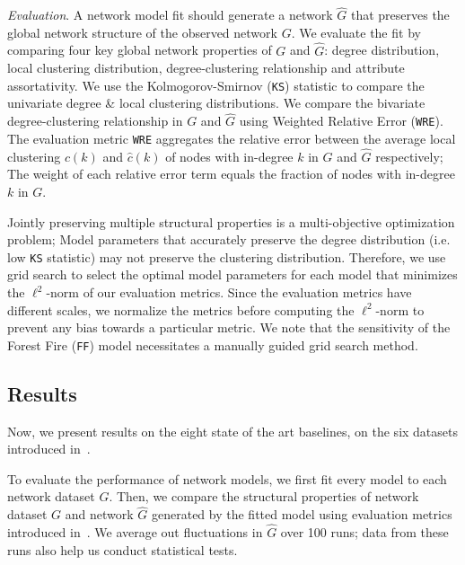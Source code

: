 \textit{Evaluation}. A network model fit should generate a network $\hat{G}$ that
preserves the global network structure of the observed network $G$. We evaluate
the fit by comparing four key global network properties of ${G}$ and $\hat{G}$:
degree distribution, local clustering distribution, degree-clustering relationship
and attribute assortativity.
We use the Kolmogorov-Smirnov (\texttt{KS}) statistic to compare the univariate degree
\& local clustering distributions.
We compare the bivariate degree-clustering relationship in $G$ and $\hat{G}$ using
Weighted Relative Error (\texttt{WRE}). The evaluation metric \texttt{WRE} aggregates the relative error
between the average local clustering $c(k)$ and $\hat{c}(k)$ of nodes  with in-degree $k$
in $G$ and $\hat{G}$ respectively; The weight of each relative error term equals the fraction
of nodes with in-degree $k$ in $G$.

Jointly preserving multiple structural properties is a multi-objective optimization
problem; Model parameters that accurately preserve the degree distribution
(i.e. low \texttt{KS} statistic) may not preserve the clustering distribution.
Therefore, we use grid search to select the optimal model parameters for each model that minimizes the
$\ell^2$-norm of our evaluation metrics. Since the evaluation metrics have
different scales, we normalize the metrics before computing the $\ell^2$-norm
to prevent any bias towards a particular metric. We note that the sensitivity of the Forest Fire (\texttt{FF}) model necessitates a manually guided grid search method.


\subsection{Results}
\label{sub:Experimental Results}

Now, we present results on the eight state of the art baselines, on the six datasets introduced in~.

To evaluate the performance of network models, we first fit every model
to each network dataset $G$. Then, we compare the structural properties of
network dataset $G$ and network $\hat{G}$ generated by the fitted model using
evaluation metrics introduced in~. We average out
fluctuations in $\hat{G}$ over 100 runs; data from these runs also help us conduct statistical tests.

